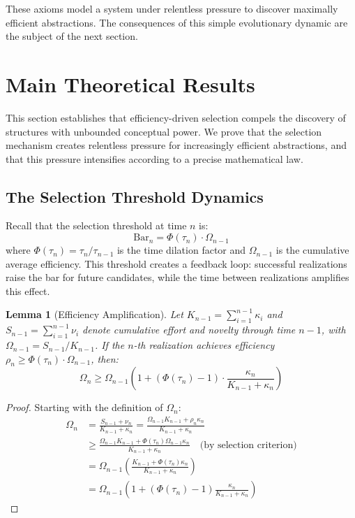\documentclass[11pt]{article}
\theoremstyle{definition}
\theoremstyle{plain}
\newtheorem{lemma}{Lemma}
\theoremstyle{remark}
\begin{document}
These axioms model a system under relentless pressure to discover maximally efficient abstractions. The consequences of this simple evolutionary dynamic are the subject of the next section.

\section{Main Theoretical Results}
\label{sec:theory}

This section establishes that efficiency-driven selection compels the discovery of structures with unbounded conceptual power. We prove that the selection mechanism creates relentless pressure for increasingly efficient abstractions, and that this pressure intensifies according to a precise mathematical law.

\subsection{The Selection Threshold Dynamics}

Recall that the selection threshold at time $n$ is:
\[
\text{Bar}_n = \Phi(\tau_n) \cdot \Omega_{n-1}
\]
where $\Phi(\tau_n) = \tau_n/\tau_{n-1}$ is the time dilation factor and $\Omega_{n-1}$ is the cumulative average efficiency. This threshold creates a feedback loop: successful realizations raise the bar for future candidates, while the time between realizations amplifies this effect.

\begin{lemma}[Efficiency Amplification]\label{lem:amplification}
Let $K_{n-1} = \sum_{i=1}^{n-1} \kappa_i$ and $S_{n-1} = \sum_{i=1}^{n-1} \nu_i$ denote cumulative effort and novelty through time $n-1$, with $\Omega_{n-1} = S_{n-1}/K_{n-1}$. If the $n$-th realization achieves efficiency $\rho_n \geq \Phi(\tau_n) \cdot \Omega_{n-1}$, then:
\[
\Omega_n \geq \Omega_{n-1}\left(1 + (\Phi(\tau_n) - 1) \cdot \frac{\kappa_n}{K_{n-1} + \kappa_n}\right)
\]
\end{lemma}

\begin{proof}
Starting with the definition of $\Omega_n$:
\begin{align*}
\Omega_n &= \frac{S_{n-1} + \nu_n}{K_{n-1} + \kappa_n} = \frac{\Omega_{n-1}K_{n-1} + \rho_n\kappa_n}{K_{n-1} + \kappa_n} \\
&\geq \frac{\Omega_{n-1}K_{n-1} + \Phi(\tau_n)\Omega_{n-1}\kappa_n}{K_{n-1} + \kappa_n} \quad \text{(by selection criterion)} \\
&= \Omega_{n-1}\left(\frac{K_{n-1} + \Phi(\tau_n)\kappa_n}{K_{n-1} + \kappa_n}\right) \\
&= \Omega_{n-1}\left(1 + (\Phi(\tau_n) - 1)\frac{\kappa_n}{K_{n-1} + \kappa_n}\right)
\end{align*}
\end{proof}
\end{document}
